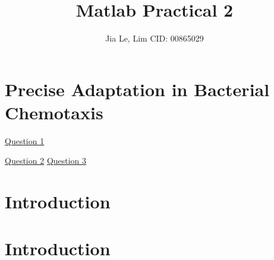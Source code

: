 \documentclass[11pt]{article}
\title{\textbf{\LARGE{Matlab Practical 2}}}
\date{}
\author{%
\large{ Jia Le, Lim {  } CID: 00865029 }
}
\makeatletter
\renewcommand{\maketitle}{\bgroup\setlength{\parindent}{0pt}
\begin{flushleft}
  \textbf{\@title} %

  \@author
\end{flushleft}\egroup
}
\makeatother
\begin{document}
\maketitle
\medskip

\section{Precise Adaptation in Bacterial Chemotaxis}
\underline{Question 1}


\underline{Question 2}
\underline{Question 3}

\section{Introduction}
\section{Introduction}



\newpage


\end{document}
